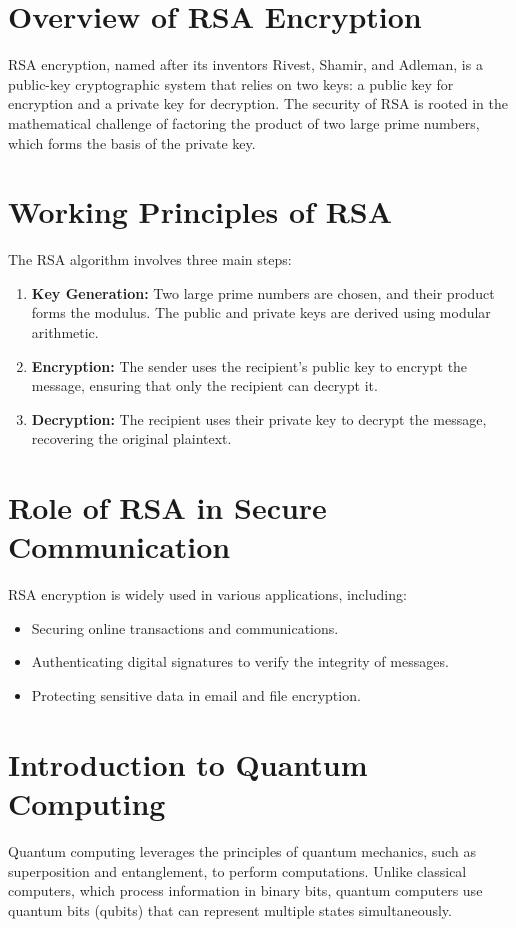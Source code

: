 \documentclass[12pt,a4paper]{report}
\begin{document}
\section{Overview of RSA Encryption}
RSA encryption, named after its inventors Rivest, Shamir, and Adleman, is a public-key cryptographic system that relies on two keys: a public key for encryption and a private key for decryption. The security of RSA is rooted in the mathematical challenge of factoring the product of two large prime numbers, which forms the basis of the private key.

\section{Working Principles of RSA}
The RSA algorithm involves three main steps:
\begin{enumerate}
    \item \textbf{Key Generation:} Two large prime numbers are chosen, and their product forms the modulus. The public and private keys are derived using modular arithmetic.
    \item \textbf{Encryption:} The sender uses the recipient's public key to encrypt the message, ensuring that only the recipient can decrypt it.
    \item \textbf{Decryption:} The recipient uses their private key to decrypt the message, recovering the original plaintext.
\end{enumerate}

\section{Role of RSA in Secure Communication}
RSA encryption is widely used in various applications, including:
\begin{itemize}
    \item Securing online transactions and communications.
    \item Authenticating digital signatures to verify the integrity of messages.
    \item Protecting sensitive data in email and file encryption.
\end{itemize}

\section{Introduction to Quantum Computing}
Quantum computing leverages the principles of quantum mechanics, such as superposition and entanglement, to perform computations. Unlike classical computers, which process information in binary bits, quantum computers use quantum bits (qubits) that can represent multiple states simultaneously.
\end{document}
